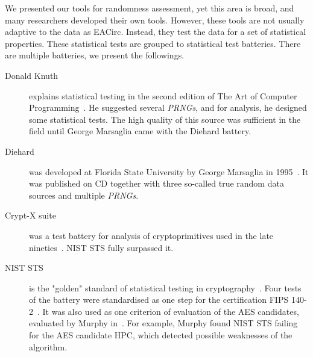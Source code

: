 \documentclass[
    digital,    %
    oneside,    %
    color,
    11pt,
    nocover,
    notable,
    nolof,
    nolot,
]{fithesis3}
\begin{document}
We presented our tools for randomness assessment, yet this area is broad, and many researchers developed their own tools. However, these tools are not usually adaptive to the data as EACirc. Instead, they test the data for a set of statistical properties. These statistical tests are grouped to statistical test batteries. There are multiple batteries, we present the followings.


\begin{description}
    \item[Donald Knuth] explains statistical testing in the second edition of The Art of Computer Programming~\cite{knuth1969vol}. He suggested several \textit{PRNGs}, and for analysis, he designed some statistical tests. The high quality of this source was sufficient in the field until George Marsaglia came with the Diehard battery. %
    \item[Diehard] was developed at Florida State University by George Marsaglia in 1995~\cite{marsaglia1996diehard}. It was published on CD together with three so-called true random data sources and multiple \textit{PRNGs}. %
    \item[Crypt-X suite] was a test battery for analysis of cryptoprimitives used in the late nineties~\cite{cryptxs}. NIST STS fully surpassed it. %
    \item[NIST STS] is the "golden" standard of statistical testing in cryptography~\cite{rukhin2001statistical}. Four tests of the battery were standardised as one step for the certification FIPS 140-2~\cite{fips2001140}. It was also used as one criterion of evaluation of the AES candidates, evaluated by Murphy in~\cite{murphy2000power}. For example, Murphy found NIST STS failing for the AES candidate HPC, which detected possible weaknesses of the algorithm.


\end{description}
\end{document}
